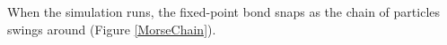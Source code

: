 When the simulation runs, the fixed-point bond snaps as the chain of particles
swings around (Figure \ref{MorseChain}). 

